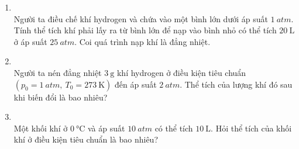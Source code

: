 \begin{enumerate}[label=\bfseries Câu \arabic*:, leftmargin=1.7cm]
\item {}\\
Người ta điều chế khí hydrogen và chứa vào một bình lớn dưới áp suất $\SI{1}{atm}$. Tính thể tích khí phải lấy ra từ bình lớn để nạp vào bình nhỏ có thể tích $\SI{20}{\liter}$ ở áp suất $\SI{25}{atm}$. Coi quá trình nạp khí là đẳng nhiệt.

\item {}\\
Người ta nén đẳng nhiệt $\SI{3}{\gram}$ khí hydrogen ở điều kiện tiêu chuẩn $\left(p_0=\SI{1}{atm},\ T_0=\SI{273}{\kelvin}\right)$ đến áp suất $\SI{2}{atm}$. Thể tích của lượng khí đó sau khi biến đổi là bao nhiêu?

\item {}\\
Một khối khí ở $\SI{0}{\celsius}$ và áp suất $\SI{10}{atm}$ có thể tích $\SI{10}{\liter}$. Hỏi thể tích của khối khí ở điều kiện tiêu chuẩn là bao nhiêu?


\end{enumerate}

